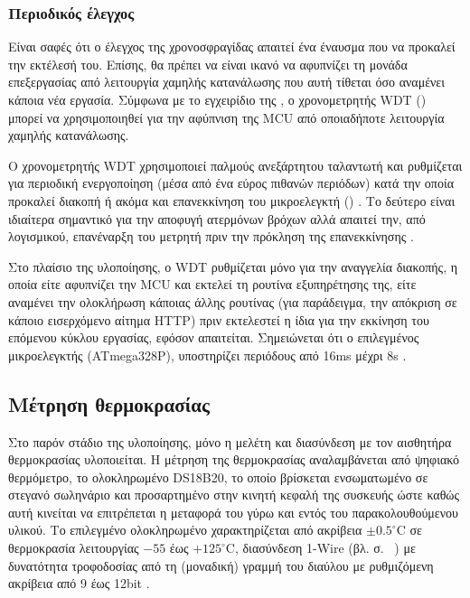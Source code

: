 \subsubsection{Περιοδικός έλεγχος}

Είναι σαφές ότι ο έλεγχος της χρονοσφραγίδας απαιτεί ένα έναυσμα που να προκαλεί
την εκτέλεσή του. Επίσης, θα πρέπει να είναι ικανό να αφυπνίζει τη μονάδα
επεξεργασίας από λειτουργία χαμηλής κατανάλωσης που αυτή τίθεται όσο αναμένει
κάποια νέα εργασία. Σύμφωνα με το εγχειρίδιο της \textcite[38]{atmel13}, ο
χρονομετρητής WDT () μπορεί να χρησιμοποιηθεί για την
αφύπνιση της MCU από οποιαδήποτε λειτουργία χαμηλής κατανάλωσης.

Ο χρονομετρητής WDT χρησιμοποιεί παλμούς ανεξάρτητου ταλαντωτή και ρυθμίζεται
για περιοδική ενεργοποίηση (μέσα από ένα εύρος πιθανών περιόδων) κατά την οποία
προκαλεί διακοπή ή ακόμα και επανεκκίνηση του μικροελεγκτή ()
\parencite[50]{atmel13}. Το δεύτερο είναι ιδιαίτερα σημαντικό για την αποφυγή
ατερμόνων βρόχων αλλά απαιτεί την, από λογισμικού, επανέναρξη του μετρητή πριν
την πρόκληση της επανεκκίνησης \parencite[50]{atmel13}.

Στο πλαίσιο της υλοποίησης, ο WDT ρυθμίζεται μόνο για την αναγγελία διακοπής, η
οποία είτε αφυπνίζει την MCU και εκτελεί τη ρουτίνα εξυπηρέτησης της, είτε
αναμένει την ολοκλήρωση κάποιας άλλης ρουτίνας (για παράδειγμα, την απόκριση σε
κάποιο εισερχόμενο αίτημα HTTP) πριν εκτελεστεί η ίδια για την εκκίνηση του
επόμενου κύκλου εργασίας, εφόσον απαιτείται. Σημειώνεται ότι ο επιλεγμένος
μικροελεγκτής (ATmega328P), υποστηρίζει περιόδους από 16ms μέχρι 8s
\parencite[55]{atmel13}.


\subsection{Μέτρηση θερμοκρασίας}
\label{subsec:ds18b20}

Στο παρόν στάδιο της υλοποίησης, μόνο η μελέτη και διασύνδεση με τον αισθητήρα
θερμοκρασίας υλοποιείται.
Η μέτρηση της θερμοκρασίας αναλαμβάνεται από ψηφιακό θερμόμετρο, το ολοκληρωμένο
DS18B20, το οποίο βρίσκεται ενσωματωμένο σε στεγανό σωληνάριο και προσαρτημένο
στην κινητή κεφαλή της συσκευής ώστε καθώς αυτή κινείται να επιτρέπεται η
μεταφορά του γύρω και εντός του παρακολουθούμενου υλικού. Το επιλεγμένο
ολοκληρωμένο χαρακτηρίζεται από ακρίβεια $\pm0.5^\circ$C σε θερμοκρασία
λειτουργίας $-55$ έως $+125^\circ$C, διασύνδεση 1-Wire (βλ. σ.~%
\pageref{subsec:1-wire}) με δυνατότητα τροφοδοσίας από τη (μοναδική) γραμμή του
διαύλου με ρυθμιζόμενη ακρίβεια από 9 έως 12bit \parencite[1]{ds18b20}.

